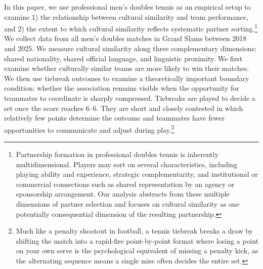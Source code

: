\documentclass[10pt]{article}
\begin{document}
In this paper, we use professional men's doubles tennis as an empirical setup to examine 1) the relationship between cultural similarity and team performance, and 2) the extent to which cultural similarity reflects systematic partner sorting.\footnote{Partnership formation in professional doubles tennis is inherently multidimensional. Players may sort on several characteristics, including playing ability and experience, strategic complementarity, and institutional or commercial connections such as shared representation by an agency or sponsorship arrangement. Our analysis abstracts from these multiple dimensions of partner selection and focuses on cultural similarity as one potentially consequential dimension of the resulting partnership.} We collect data from all men's doubles matches in Grand Slams between 2018 and 2025. We measure cultural similarity along three complementary dimensions: shared nationality, shared official language, and linguistic proximity. We first examine whether culturally similar teams are more likely to win their matches. We then use tiebreak outcomes to examine a theoretically important boundary condition: whether the association remains visible when the opportunity for teammates to coordinate is sharply compressed. Tiebreaks are played to decide a set once the score reaches 6--6. They are short and closely contested in which relatively few points determine the outcome and teammates have fewer opportunities to communicate and adjust during play.\footnote{Much like a penalty shootout in football, a tennis tiebreak breaks a draw by shifting the match into a rapid-fire point-by-point format where losing a point on your own serve is the psychological equivalent of missing a penalty kick, as the alternating sequence means a single miss often decides the entire set.}
\end{document}
